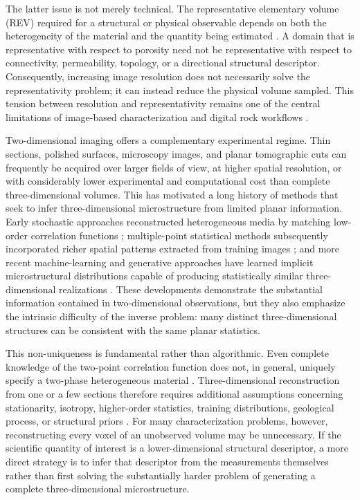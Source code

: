 \documentclass{article}
\begin{document}
The latter issue is not merely technical. The representative elementary volume (REV) required for a structural or physical observable depends on both the heterogeneity of the material and the quantity being estimated \cite{AlRaoush2010,Singh2020,Zubov2024}. A domain that is representative with respect to porosity need not be representative with respect to connectivity, permeability, topology, or a directional structural descriptor. Consequently, increasing image resolution does not necessarily solve the representativity problem; it can instead reduce the physical volume sampled. This tension between resolution and representativity remains one of the central limitations of image-based characterization and digital rock workflows \cite{Mehmani2020,Singh2020,Zubov2024}.

Two-dimensional imaging offers a complementary experimental regime. Thin sections, polished surfaces, microscopy images, and planar tomographic cuts can frequently be acquired over larger fields of view, at higher spatial resolution, or with considerably lower experimental and computational cost than complete three-dimensional volumes. This has motivated a long history of methods that seek to infer three-dimensional microstructure from limited planar information. Early stochastic approaches reconstructed heterogeneous media by matching low-order correlation functions \cite{Roberts1997,Yeong1998,Jiao2007,Jiao2008}; multiple-point statistical methods subsequently incorporated richer spatial patterns extracted from training images \cite{Okabe2005,Tahmasebi2012}; and more recent machine-learning and generative approaches have learned implicit microstructural distributions capable of producing statistically similar three-dimensional realizations \cite{Bostanabad2016,Bostanabad2018,Mosser2017,Feng2019,Feng2020,Zhang2022}. These developments demonstrate the substantial information contained in two-dimensional observations, but they also emphasize the intrinsic difficulty of the inverse problem: many distinct three-dimensional structures can be consistent with the same planar statistics.

This non-uniqueness is fundamental rather than algorithmic. Even complete knowledge of the two-point correlation function does not, in general, uniquely specify a two-phase heterogeneous material \cite{Jiao2007}. Three-dimensional reconstruction from one or a few sections therefore requires additional assumptions concerning stationarity, isotropy, higher-order statistics, training distributions, geological process, or structural priors \cite{Okabe2005,Tahmasebi2012,Bostanabad2018}. For many characterization problems, however, reconstructing every voxel of an unobserved volume may be unnecessary. If the scientific quantity of interest is a lower-dimensional structural descriptor, a more direct strategy is to infer that descriptor from the measurements themselves rather than first solving the substantially harder problem of generating a complete three-dimensional microstructure.
\end{document}
